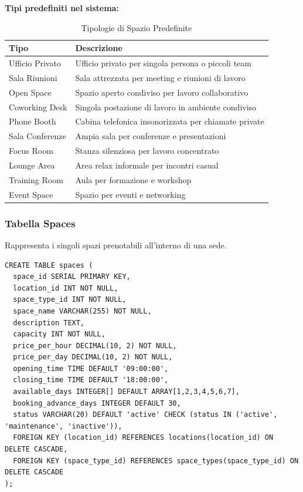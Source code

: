 \textbf{Tipi predefiniti nel sistema:}
\begin{table}[H]
\centering
\begin{tabular}{@{}ll@{}}
\toprule
\textbf{Tipo} & \textbf{Descrizione} \\
\midrule
Ufficio Privato & Ufficio privato per singola persona o piccoli team \\
Sala Riunioni & Sala attrezzata per meeting e riunioni di lavoro \\
Open Space & Spazio aperto condiviso per lavoro collaborativo \\
Coworking Desk & Singola postazione di lavoro in ambiente condiviso \\
Phone Booth & Cabina telefonica insonorizzata per chiamate private \\
Sala Conferenze & Ampia sala per conferenze e presentazioni \\
Focus Room & Stanza silenziosa per lavoro concentrato \\
Lounge Area & Area relax informale per incontri casual \\
Training Room & Aula per formazione e workshop \\
Event Space & Spazio per eventi e networking \\
\bottomrule
\end{tabular}
\caption{Tipologie di Spazio Predefinite}
\end{table}

\subsubsection{Tabella Spaces}
Rappresenta i singoli spazi prenotabili all'interno di una sede.

\begin{lstlisting}[caption=Struttura Tabella Spaces]
CREATE TABLE spaces (
  space_id SERIAL PRIMARY KEY,
  location_id INT NOT NULL,
  space_type_id INT NOT NULL,
  space_name VARCHAR(255) NOT NULL,
  description TEXT,
  capacity INT NOT NULL,
  price_per_hour DECIMAL(10, 2) NOT NULL,
  price_per_day DECIMAL(10, 2) NOT NULL,
  opening_time TIME DEFAULT '09:00:00',
  closing_time TIME DEFAULT '18:00:00',
  available_days INTEGER[] DEFAULT ARRAY[1,2,3,4,5,6,7],
  booking_advance_days INTEGER DEFAULT 30,
  status VARCHAR(20) DEFAULT 'active' CHECK (status IN ('active', 'maintenance', 'inactive')),
  FOREIGN KEY (location_id) REFERENCES locations(location_id) ON DELETE CASCADE,
  FOREIGN KEY (space_type_id) REFERENCES space_types(space_type_id) ON DELETE CASCADE
);
\end{lstlisting}

